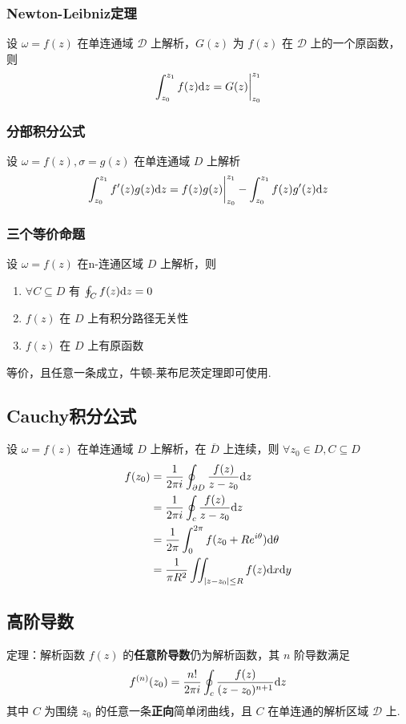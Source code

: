 \documentclass[./main.tex]{subfiles}
\begin{document}
\subsubsection{Newton-Leibniz定理}
设 $\omega=f(z)$ 在单连通域 $\mathscr{D}$ 上解析，$G(z)$ 为 $f(z)$ 在 $\mathscr{D}$ 上的一个原函数，则
\begin{equation}
    \int_{z_0}^{z_1}f(z)\text{d}z=G(z)\bigg|_{z_0}^{z_1}
\end{equation}
\subsubsection{分部积分公式}
设 $\omega=f(z),\sigma=g(z)$ 在单连通域 $D$ 上解析
\begin{equation}
    \int_{z_0}^{z_1}f'(z)g(z)\text{d}z=f(z)g(z)\bigg|_{z_0}^{z_1}-\int_{z_0}^{z_1}f(z)g'(z)\text{d}z
\end{equation}
\subsubsection{三个等价命题}
设 $\omega=f(z)$ 在n-连通区域 $D$ 上解析，则
\begin{enumerate}[(1)]
    \item $\forall C\subseteq D$ 有 $\oint_Cf(z)\text{d}z=0$
    \item $f(z)$ 在 $D$ 上有积分路径无关性
    \item $f(z)$ 在 $D$ 上有原函数
\end{enumerate}
等价，且任意一条成立，牛顿-莱布尼茨定理即可使用. 
\subsection{Cauchy积分公式}
设 $\omega=f(z)$ 在单连通域 $D$ 上解析，在 $\overline{D}$ 上连续，则 $\forall z_0\in D,C\subseteq D$
\begin{align}
    f(z_0)&=\frac{1}{2\pi i}\oint_{\partial D}\frac{f(z)}{z-z_0}\text{d}z\\
    &=\frac{1}{2\pi i}\oint_c\frac{f(z)}{z-z_0}\text{d}z\\&=\frac{1}{2\pi}\int_0^{2\pi}f(z_0+Re^{i\theta})\text{d}\theta\\&=\frac{1}{\pi R^2}\iint_{|z-z_0|\le R}f(z)\text{d}x\text{d}y
\end{align}
\subsection{高阶导数}
定理：解析函数 $f(z)$ 的\textbf{任意阶导数}仍为解析函数，其 $n$ 阶导数满足
\begin{equation}\label{thm:gjds}
    f^{(n)}(z_0)=\frac{n!}{2\pi i}\oint_c\frac{f(z)}{(z-z_0)^{n+1}}\text{d}z
\end{equation}
其中 $C$ 为围绕 $z_0$ 的任意一条\textbf{正向}简单闭曲线，且 $C$ 在单连通的解析区域 $\mathscr{D}$ 上. 
\end{document}
